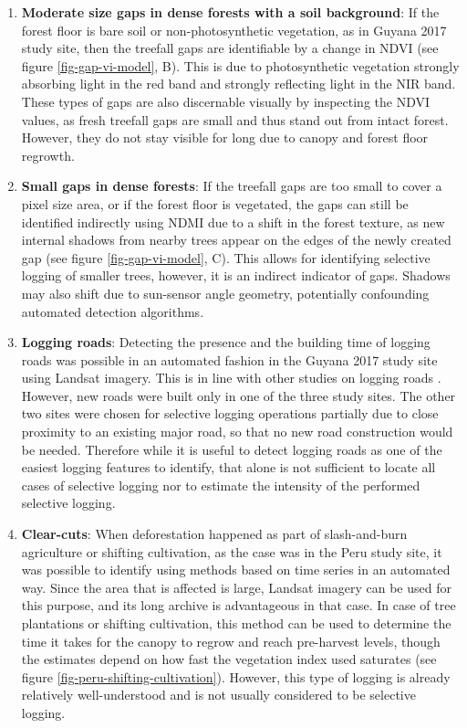\documentclass[a4paper,12pt]{scrbook}
\begin{document}
\begin{enumerate}
 \item \textbf{Moderate size gaps in dense forests with a soil background}: If the forest floor is bare soil or non-photosynthetic vegetation, as in Guyana 2017 study site, then the treefall gaps are identifiable by a change in \ac{NDVI} (see figure \ref{fig-gap-vi-model}, B). This is due to photosynthetic vegetation strongly absorbing light in the red band and strongly reflecting light in the \ac{NIR} band. These types of gaps are also discernable visually by inspecting the \ac{NDVI} values, as fresh treefall gaps are small and thus stand out from intact forest. However, they do not stay visible for long due to canopy and forest floor regrowth.
 \item \textbf{Small gaps in dense forests}: If the treefall gaps are too small to cover a pixel size area, or if the forest floor is vegetated, the gaps can still be identified indirectly using \ac{NDMI} due to a shift in the forest texture, as new internal shadows from nearby trees appear on the edges of the newly created gap (see figure \ref{fig-gap-vi-model}, C). This allows for identifying selective logging of smaller trees, however, it is an indirect indicator of gaps. Shadows may also shift due to sun-sensor angle geometry, potentially confounding automated detection algorithms.
 \item \textbf{Logging roads}: Detecting the presence and the building time of logging roads was possible in an automated fashion in the Guyana 2017 study site using Landsat imagery. This is in line with other studies on logging roads \citep{kleinschroth_how_2016}. However, new roads were built only in one of the three study sites. The other two sites were chosen for selective logging operations partially due to close proximity to an existing major road, so that no new road construction would be needed. Therefore while it is useful to detect logging roads as one of the easiest logging features to identify, that alone is not sufficient to locate all cases of selective logging nor to estimate the intensity of the performed selective logging.
 \item \textbf{Clear-cuts}: When deforestation happened as part of slash-and-burn agriculture or shifting cultivation, as the case was in the Peru study site, it was possible to identify using methods based on time series in an automated way. Since the area that is affected is large, Landsat imagery can be used for this purpose, and its long archive is advantageous in that case. In case of tree plantations or shifting cultivation, this method can be used to determine the time it takes for the canopy to regrow and reach pre-harvest levels, though the estimates depend on how fast the vegetation index used saturates (see figure \ref{fig-peru-shifting-cultivation}). However, this type of logging is already relatively well-understood and is not usually considered to be selective logging.
\end{enumerate}
\end{document}
